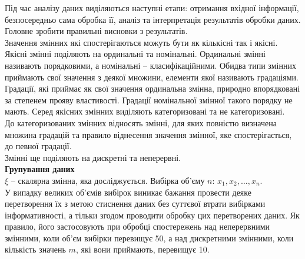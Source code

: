 




Під час аналізу даних виділяються наступні етапи: отримання вхідної інформації, безпосередньо сама обробка її, аналіз та інтерпретація результатів обробки даних. \\

Головне зробити правильні висновки з результатів. \\

Значення змінних які спостерігаються можуть бути як кількісні так і якісні. Якісні змінні поділяють на ординальні та номінальні. Ординальні змінні називають порядковими, а номінальні -- класифікаційними. Обидва типи змінних приймають свої значення з деякої множини, елементи якої називають градаціями. Градації, які приймає як свої значення ординальна змінна, природно впорядковані за степенем прояву властивості. Градації номінальної змінної такого порядку не мають. Серед якісних змінних виділяють категоризовані та не категоризовані. \\

До категоризованих змінних відносять змінні, для яких повністю визначена множина градацій та правило віднесення значення змінної, яке спостерігається, до певної градації. \\

Змінні ще поділяють на дискретні та неперервні. \\

\textbf{Групування даних} \\

$\xi$ -- скалярна змінна, яка досліджується. Вибірка об'єму $n$: $x_1, x_2, \ldots, x_n$. \\

У випадку великих об'ємів вибірок виникає бажання провести деяке перетворення їх з метою стиснення даних без суттєвої втрати вибірками інформативності, а тільки згодом проводити обробку цих перетворених даних. Як правило, його застосовують при обробці спостережень над неперервними змінними, коли об'єм вибірки перевищує 50, а над дискретними змінними, коли кількість значень $m$, які вони приймають, перевищує 10. \\

